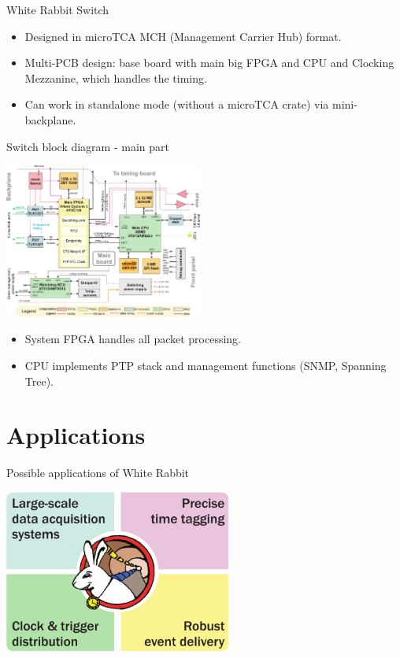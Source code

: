 \documentclass[compress,red]{beamer}
\begin{document}
\begin{frame}{White Rabbit Switch}
\begin{itemize}
\item Designed in microTCA MCH (Management Carrier Hub) format.
\item Multi-PCB design: base board with main big FPGA and CPU and Clocking Mezzanine, which handles the timing.
\item Can work in standalone mode (without a microTCA crate) via mini-backplane.
\end{itemize}
\end{frame}

\begin{frame}{Switch block diagram - main part}
\begin{center}
\includegraphics[width=6.5cm]{switch/wrs2_sw_block.pdf}
\end{center}
\begin{itemize}
\item System FPGA handles all packet processing.
\item CPU implements PTP stack and management functions (SNMP, Spanning Tree).
\end{itemize}
\end{frame}

\section{Applications}

\begin{frame}{Possible applications of White Rabbit}
\begin{center}
\includegraphics[width=7.5cm]{applications/wr_apps.pdf}
\end{center}
\end{frame}
\end{document}
